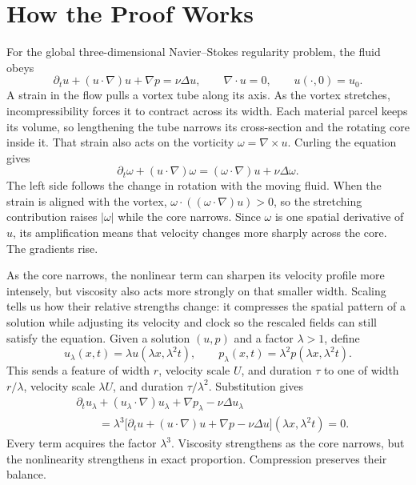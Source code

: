 \section*{How the Proof Works}

\begingroup
\setlength{\parskip}{0.38em}

For the global three-dimensional Navier--Stokes regularity problem, the fluid
obeys
\[
\partial_tu+(u\!\cdot\nabla)u+\nabla p=\nu\Delta u,
\qquad
\nabla\!\cdot u=0,
\qquad
u(\cdot,0)=u_0.
\]
A strain in the flow pulls a vortex tube along its axis. As the vortex
stretches, incompressibility forces it to contract across its width. Each
material parcel keeps its volume, so lengthening the tube narrows its
cross-section and the rotating core inside it. That strain also acts on the
vorticity
\(\omega=\nabla\times u\). Curling the equation gives
\[
\partial_t\omega+(u\!\cdot\nabla)\omega
=(\omega\!\cdot\nabla)u+\nu\Delta\omega.
\]
The left side follows the change in rotation with the moving fluid. When the
strain is aligned with the vortex,
\(\omega\cdot((\omega\!\cdot\nabla)u)>0\), so the stretching contribution raises
\(|\omega|\) while the core narrows. Since \(\omega\) is one spatial derivative
of \(u\), its amplification means that velocity changes more sharply across the
core. The gradients rise.

As the core narrows, the nonlinear term can sharpen its velocity profile more
intensely, but viscosity also acts more strongly on that smaller width. Scaling
tells us how their relative strengths change: it compresses the spatial pattern
of a solution while adjusting its velocity and clock so the rescaled fields can
still satisfy the equation. Given a solution \((u,p)\) and a factor
\(\lambda>1\), define
\[
u_\lambda(x,t)=\lambda u(\lambda x,\lambda^2t),
\qquad
p_\lambda(x,t)=\lambda^2p(\lambda x,\lambda^2t).
\]
This sends a feature of width \(r\), velocity scale \(U\), and duration \(\tau\)
to one of width \(r/\lambda\), velocity scale \(\lambda U\), and duration
\(\tau/\lambda^2\). Substitution gives
\[
\begin{aligned}
&\partial_tu_\lambda
 +(u_\lambda\!\cdot\nabla)u_\lambda
 +\nabla p_\lambda-\nu\Delta u_\lambda\\
&\qquad
=\lambda^3
 \bigl[\partial_tu+(u\!\cdot\nabla)u+\nabla p-\nu\Delta u\bigr]
 (\lambda x,\lambda^2t)
=0.
\end{aligned}
\]
Every term acquires the factor \(\lambda^3\). Viscosity strengthens as the core
narrows, but the nonlinearity strengthens in exact proportion. Compression
preserves their balance.

